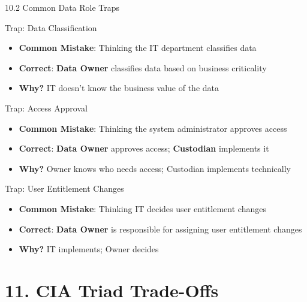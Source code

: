 \documentclass{beamer}
\begin{document}
	\begin{frame}{10.2 Common Data Role Traps}
		\begin{block}{Trap: Data Classification}
			\begin{itemize}
				\item \textbf{Common Mistake}: Thinking the IT department classifies data
				\item \textbf{Correct}: \textbf{Data Owner} classifies data based on business criticality
				\item \textbf{Why?} IT doesn't know the business value of the data
			\end{itemize}
		\end{block}
		
		\begin{block}{Trap: Access Approval}
			\begin{itemize}
				\item \textbf{Common Mistake}: Thinking the system administrator approves access
				\item \textbf{Correct}: \textbf{Data Owner} approves access; \textbf{Custodian} implements it
				\item \textbf{Why?} Owner knows who needs access; Custodian implements technically
			\end{itemize}
		\end{block}
		
		\begin{block}{Trap: User Entitlement Changes}
			\begin{itemize}
				\item \textbf{Common Mistake}: Thinking IT decides user entitlement changes
				\item \textbf{Correct}: \textbf{Data Owner} is responsible for assigning user entitlement changes
				\item \textbf{Why?} IT implements; Owner decides
			\end{itemize}
		\end{block}
	\end{frame}
	
	\section{11. CIA Triad Trade-Offs}
	
\end{document}
